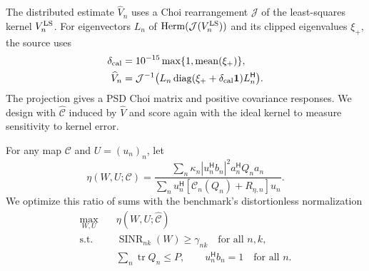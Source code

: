 \documentclass[journal]{IEEEtran}
\DeclareMathOperator{\tr}{tr}
\DeclareMathOperator{\Herm}{Herm}
\DeclareMathOperator{\SINR}{SINR}
\newcommand{\HH}{^{\mathsf H}}
\begin{document}
The distributed estimate \(\widehat V_n\) uses a Choi rearrangement \(\mathcal J\) of the least-squares kernel \(V_n^{\rm LS}\). For eigenvectors \(L_n\) of \(\Herm(\mathcal J(V_n^{\rm LS}))\) and its clipped eigenvalues \(\xi_+\), the source uses
\begin{align}
 \delta_{\rm cal}&=10^{-15}\max\{1,\operatorname{mean}(\xi_+)\},\\
 \widehat V_n&=\mathcal J^{-1}\bigl(L_n
     \operatorname{diag}(\xi_++\delta_{\rm cal}\mathbf 1)L_n\HH\bigr).
\end{align}
The projection gives a PSD Choi matrix and positive covariance responses. We design with \(\widehat{\mathcal C}\) induced by \(\widehat V\) and score again with the ideal kernel to measure sensitivity to kernel error.

For any map \(\mathcal C\) and \(U=(u_n)_n\), let
\begin{equation}
 \eta(W,U;\mathcal C)=
 \frac{\sum_n \kappa_n|u_n\HH b_n|^2 a_n\HH Q_na_n}
 {\sum_n u_n\HH [\mathcal C_n(Q_n)+R_{\eta,n}]u_n}.
 \label{eq:scnr}
\end{equation}
We optimize this ratio of sums with the benchmark's distortionless normalization
\begin{subequations}\label{eq:joint}
\begin{align}
 \max_{W,U}\quad &\eta(W,U;\widehat{\mathcal C})\\
 \text{s.t.}\quad &\SINR_{nk}(W)\ge\gamma_{nk}\quad\text{for all }n,k,\\
 &\sum_n\tr Q_n\le P,\qquad u_n\HH b_n=1\quad\text{for all }n.
\end{align}
\end{subequations}
\end{document}
